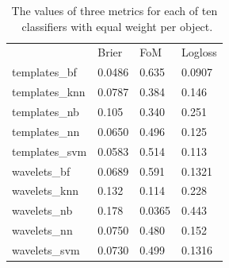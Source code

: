 \begin{table}[]
\begin{tabular}{llll}
& Brier   & FoM   & Logloss            \\
templates\_bf  						 & 0.0486  & 0.635  & 0.0907  \\
templates\_knn             & 0.0787  & 0.384 & 0.146  \\
templates\_nb              & 0.105  & 0.340  & 0.251 \\
templates\_nn							 & 0.0650  & 0.496   & 0.125 \\
templates\_svm             & 0.0583 & 0.514  & 0.113 \\
wavelets\_bf   						 & 0.0689  & 0.591  & 0.1321 \\
wavelets\_knn              & 0.132  & 0.114 & 0.228 \\
wavelets\_nb               & 0.178  & 0.0365 & 0.443  \\
wavelets\_nn 							 & 0.0750  & 0.480  & 0.152 \\
wavelets\_svm              & 0.0730  & 0.499  & 0.1316 \\
\end{tabular}
\caption{The values of three metrics for each of ten \snmachine\ classifiers with equal weight per object.}
	\label{tab:snmachinevals}
\end{table}

